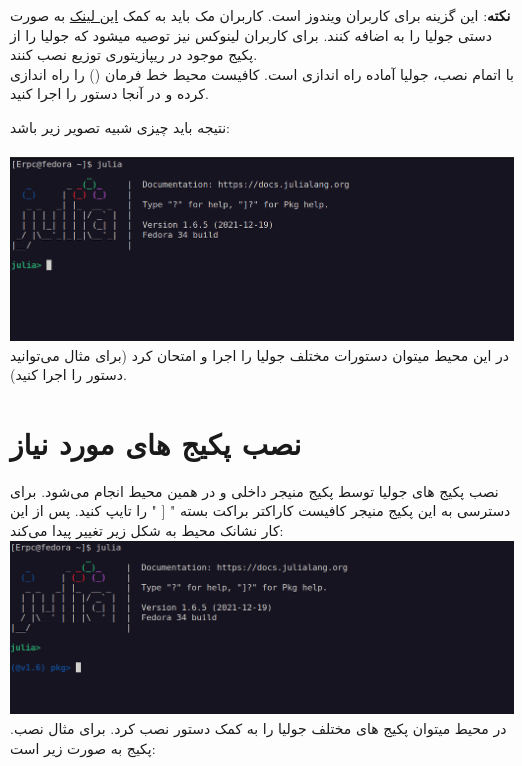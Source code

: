 \documentclass[a4paper]{article}
\begin{document}
	\textbf{نکته}: این گزینه برای کاربران ویندوز است. کاربران مک باید به کمک 
	\href{https://julialang.org/downloads/platform/#macos}{این لینک} به صورت دستی جولیا را به  اضافه کنند. برای کاربران لینوکس نیز توصیه میشود که جولیا را از پکیج موجود در ریپازیتوری توزیع نصب کنند. \\

	با اتمام نصب، جولیا آماده راه اندازی است. کافیست محیط خط فرمان () را راه اندازی کرده و در آنجا دستور  را اجرا کنید.

	نتیجه باید چیزی شبیه تصویر زیر باشد: \\\\

	\includegraphics[width = \textwidth]{../img/img-3} \\

	 در این محیط میتوان دستورات مختلف جولیا را اجرا و امتحان کرد (برای مثال می‌توانید دستور  را اجرا کنید). 

	\section{نصب پکیج های مورد نیاز}
	نصب پکیج های جولیا توسط پکیج منیجر داخلی و در همین محیط انجام می‌شود. برای دسترسی به این پکیج منیجر کافیست کاراکتر براکت بسته " [ " را تایپ کنید. پس از این کار نشانک محیط به شکل زیر تغییر پیدا می‌کند: \\

	\includegraphics[width = \textwidth]{../img/img-4} \\

	.در محیط میتوان پکیج های مختلف جولیا را به کمک دستور   نصب کرد. برای مثال نصب پکیج  به صورت زیر است:\\
\end{document}

